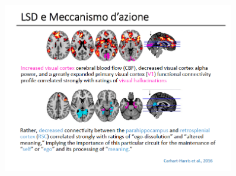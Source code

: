 \begin{figure}[!ht]
\centering
	\includegraphics[width=0.9\textwidth]{017/image25.png}
\end{figure}
